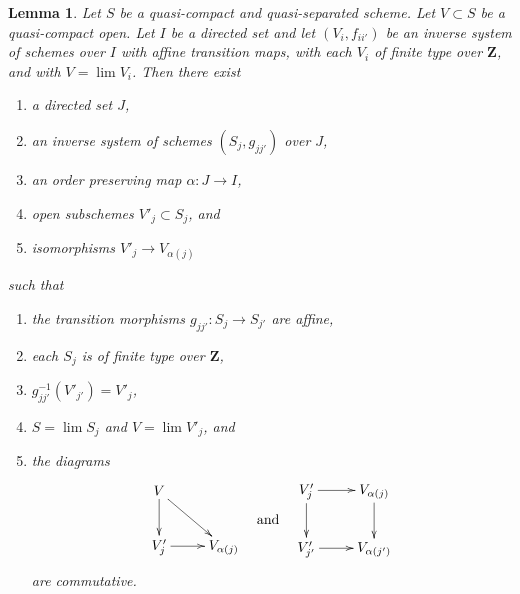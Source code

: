\documentclass{amsart}
\theoremstyle{plain}
\newtheorem{lemma}[subsection]{Lemma}
\theoremstyle{definition}
\theoremstyle{remark}
\numberwithin{equation}{subsection}
\def\lim{\mathop{\mathrm{lim}}\nolimits}
\begin{document}
\begin{lemma}
\label{lemma-approximate}
Let $S$ be a quasi-compact and quasi-separated scheme. Let $V \subset S$
be a quasi-compact open. Let $I$ be a directed set
and let $(V_i, f_{ii'})$ be an inverse system of schemes over $I$
with affine transition maps, with each $V_i$ of finite type over $\mathbf{Z}$,
and with $V = \lim V_i$. Then there exist
\begin{enumerate}
\item a directed set $J$,
\item an inverse system of schemes $(S_j, g_{jj'})$ over $J$,
\item an order preserving map $\alpha : J \to I$,
\item open subschemes $V'_j \subset S_j$, and
\item isomorphisms $V'_j \to V_{\alpha(j)}$
\end{enumerate}
such that
\begin{enumerate}
\item the transition morphisms $g_{jj'} : S_j \to S_{j'}$ are affine,
\item each $S_j$ is of finite type over $\mathbf{Z}$,
\item $g_{jj'}^{-1}(V'_{j'}) = V'_j$,
\item $S = \lim S_j$ and $V = \lim V'_j$, and
\item the diagrams
$$
\vcenter{
\xymatrix{
V \ar[d] \ar[rd] \\
V'_j \ar[r] & V_{\alpha(j)}
}
}
\quad\text{and}\quad
\vcenter{
\xymatrix{
V'_j \ar[r] \ar[d] & V_{\alpha(j)} \ar[d] \\
V'_{j'} \ar[r] & V_{\alpha(j')}
}
}
$$
are commutative.
\end{enumerate}
\end{lemma}
\end{document}
